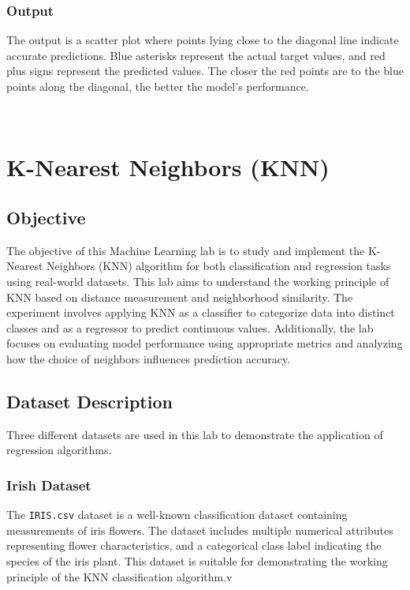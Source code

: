 \documentclass[11pt,a4paper]{report}
\begin{document}
\subsection*{Output}
The output is a scatter plot where points lying close to the diagonal line indicate accurate predictions. Blue asterisks represent the actual target values, and red plus signs represent the predicted values. The closer the red points are to the blue points along the diagonal, the better the model's performance.
    \begin{center}
    \end{center}
    { \hspace*{\fill} \\}
    




\chapter{K-Nearest Neighbors (KNN)}

\section*{Objective}

The objective of this Machine Learning lab is to study and implement the K-Nearest Neighbors (KNN) algorithm for both classification and regression tasks using real-world datasets. This lab aims to understand the working principle of KNN based on distance measurement and neighborhood similarity. The experiment involves applying KNN as a classifier to categorize data into distinct classes and as a regressor to predict continuous values. Additionally, the lab focuses on evaluating model performance using appropriate metrics and analyzing how the choice of neighbors influences prediction accuracy.


\section*{Dataset Description}

Three different datasets are used in this lab to demonstrate the application of regression algorithms.

\subsection*{Irish Dataset}
The \texttt{IRIS.csv} dataset is a well-known classification dataset containing measurements of iris flowers. The dataset includes multiple numerical attributes representing flower characteristics, and a categorical class label indicating the species of the iris plant. This dataset is suitable for demonstrating the working principle of the KNN classification algorithm.v
\end{document}
